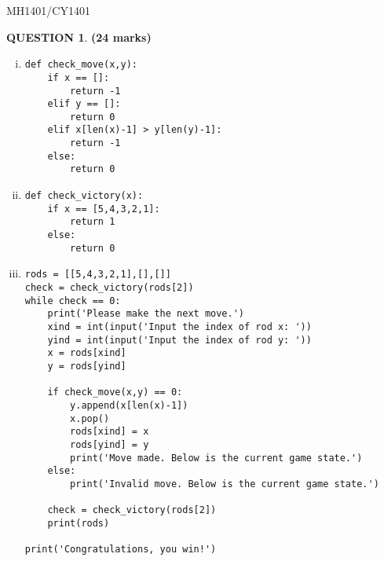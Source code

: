 \documentclass[a4paper,12pt]{article}
\theoremstyle{definition}
\newtheorem{ques}[dummy]{QUESTION}
\theoremstyle{plain}
\newcommand{\py}{python}
\begin{document}
	\newpage
	\hfill MH1401/CY1401\vspace*{0.5em}
	
	\begin{ques}\hfill\textbf{(24 marks)}\\
		\begin{enumerate}[(i)]
			\item 
			\begin{verbatim}
def check_move(x,y):
    if x == []:
        return -1
    elif y == []:
        return 0
    elif x[len(x)-1] > y[len(y)-1]:
        return -1
    else:
        return 0
			\end{verbatim}
			\item
			\begin{verbatim}
def check_victory(x):
    if x == [5,4,3,2,1]:
        return 1
    else:
        return 0
			\end{verbatim}
			
			\item 
			\begin{verbatim}
rods = [[5,4,3,2,1],[],[]]
check = check_victory(rods[2])
while check == 0:
    print('Please make the next move.')
    xind = int(input('Input the index of rod x: '))
    yind = int(input('Input the index of rod y: '))
    x = rods[xind]
    y = rods[yind]
    
    if check_move(x,y) == 0:
        y.append(x[len(x)-1])
        x.pop()
        rods[xind] = x
        rods[yind] = y
        print('Move made. Below is the current game state.')
    else:
        print('Invalid move. Below is the current game state.')
    
    check = check_victory(rods[2])
    print(rods)
    
print('Congratulations, you win!')
			\end{verbatim}
		\end{enumerate}
	\end{ques}
	
	
	
	
	
	
	
	
	
	
	
	
	
	
	
	
\end{document}
